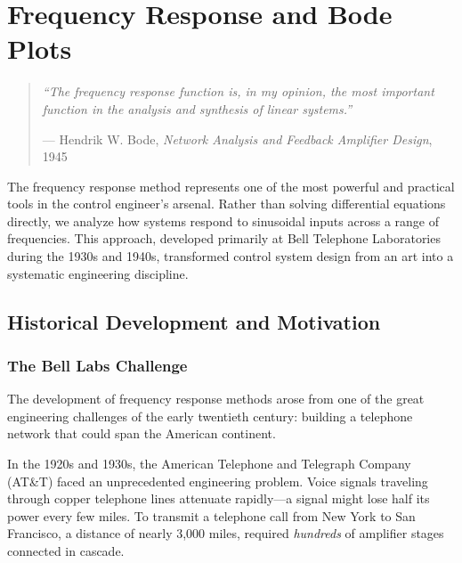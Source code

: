 
\setcounter{chapter}{12}
\chapter{Frequency Response and Bode Plots}
\label{ch:bode}

\begin{quote}
\textit{``The frequency response function is, in my opinion, the most important function in the analysis and synthesis of linear systems.''}

\hfill --- Hendrik W. Bode, \textit{Network Analysis and Feedback Amplifier Design}, 1945
\end{quote}

\vspace{1em}

\noindent
The frequency response method represents one of the most powerful and practical tools in the control engineer's arsenal. Rather than solving differential equations directly, we analyze how systems respond to sinusoidal inputs across a range of frequencies. This approach, developed primarily at Bell Telephone Laboratories during the 1930s and 1940s, transformed control system design from an art into a systematic engineering discipline.

\section{Historical Development and Motivation}
\label{sec:bode_history}

\subsection{The Bell Labs Challenge}

\begin{historicalbox}
The development of frequency response methods arose from one of the great engineering challenges of the early twentieth century: building a telephone network that could span the American continent.
\end{historicalbox}

In the 1920s and 1930s, the American Telephone and Telegraph Company (AT\&T) faced an unprecedented engineering problem. Voice signals traveling through copper telephone lines attenuate rapidly---a signal might lose half its power every few miles. To transmit a telephone call from New York to San Francisco, a distance of nearly 3,000 miles, required \textit{hundreds} of amplifier stages connected in cascade.

